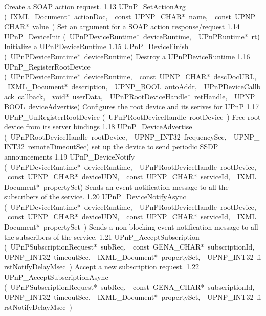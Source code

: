 \documentclass{article}
\begin{document}
\begin{cxxentry}
\begin{cxxnames}
        {Create a SOAP action request. }
        {1.13}
        {UPnP\_SetActionArg}
        {(\ IXML\_Document*\ actionDoc,\ \ const\ UPNP\_CHAR*\ name,\ \ const\ UPNP\_CHAR*\ value\ )}
        {Set an argument for a SOAP action response/request }
        {1.14}
        {UPnP\_DeviceInit}
        {(\ UPnPDeviceRuntime*\ deviceRuntime,\ \ UPnPRuntime*\ rt)}
        {Initialize a UPnPDeviceRuntime }
        {1.15}
        {UPnP\_DeviceFinish}
        {(\ UPnPDeviceRuntime*\ deviceRuntime)}
        {Destroy a UPnPDeviceRuntime }
        {1.16}
        {UPnP\_RegisterRootDevice}
        {(\ UPnPDeviceRuntime*\ deviceRuntime,\ \ const\ UPNP\_CHAR*\ descDocURL,\ \ IXML\_Document*\ description,\ \ UPNP\_BOOL\ autoAddr,\ \ UPnPDeviceCallback\ callback,\ \ void*\ userData,\ \ UPnPRootDeviceHandle*\ retHandle,\ \ UPNP\_BOOL\ deviceAdvertise)}
        {Configures the root device and its serives for UPnP }
        {1.17}
        {UPnP\_UnRegisterRootDevice}
        {(\ UPnPRootDeviceHandle\ rootDevice\ )}
        {Free root device from its server bindings }
        {1.18}
        {UPnP\_DeviceAdvertise}
        {(\ UPnPRootDeviceHandle\ rootDevice,\ \ UPNP\_INT32\ frequencySec,\ \ UPNP\_INT32\ remoteTimeoutSec)}
        {set up the device to send periodic SSDP announcements }
        {1.19}
        {UPnP\_DeviceNotify}
        {(\ UPnPDeviceRuntime*\ deviceRuntime,\ \ UPnPRootDeviceHandle\ rootDevice,\ \ const\ UPNP\_CHAR*\ deviceUDN,\ \ const\ UPNP\_CHAR*\ serviceId,\ \ IXML\_Document*\ propertySet)}
        {Sends an event notification message to all the subscribers of the service.}
        {1.20}
        {UPnP\_DeviceNotifyAsync}
        {(\ UPnPDeviceRuntime*\ deviceRuntime,\ \ UPnPRootDeviceHandle\ rootDevice,\ \ const\ UPNP\_CHAR*\ deviceUDN,\ \ const\ UPNP\_CHAR*\ serviceId,\ \ IXML\_Document*\ propertySet\ )}
        {Sends a non blocking event notification message to all the subscribers of the service.}
        {1.21}
        {UPnP\_AcceptSubscription}
        {(\ UPnPSubscriptionRequest*\ subReq,\ \ const\ GENA\_CHAR*\ subscriptionId,\ \ UPNP\_INT32\ timeoutSec,\ \ IXML\_Document*\ propertySet,\ \ UPNP\_INT32\ firstNotifyDelayMsec\ )}
        {Accept a new subscription request. }
        {1.22}
        {UPnP\_AcceptSubscriptionAsync}
        {(\ UPnPSubscriptionRequest*\ subReq,\ \ const\ GENA\_CHAR*\ subscriptionId,\ \ UPNP\_INT32\ timeoutSec,\ \ IXML\_Document*\ propertySet,\ \ UPNP\_INT32\ firstNotifyDelayMsec\ )}

\end{cxxnames}
\end{cxxentry}
\end{document}
